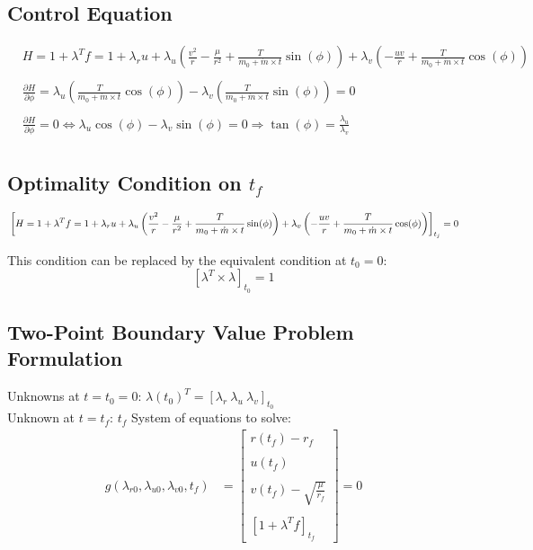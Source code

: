 \documentclass{article}
\begin{document}
	\subsection{Control Equation}
	\begin{align*}
		& H=1+\lambda^T f=1+\lambda_r u+\lambda_u\left(\frac{v^2}{r}-\frac{\mu}{r^2}+\frac{T}{m_0+\dot{m} \times t} \sin (\phi)\right)+\lambda_v\left(-\frac{u v}{r}+\frac{T}{m_0+\dot{m} \times t} \cos (\phi)\right) \\ \\
		& \frac{\partial H}{\partial \phi}=\lambda_u\left(\frac{T}{m_0+\dot{m} \times t} \cos (\phi)\right)-\lambda_v\left(\frac{T}{m_0+\dot{m} \times t} \sin (\phi)\right)=0 \\ \\
		& \frac{\partial H}{\partial \phi}=0 \Leftrightarrow \lambda_u \cos (\phi)-\lambda_v \sin (\phi)=0 \Rightarrow \tan (\phi)=\frac{\lambda_u}{\lambda_v} \\
	\end{align*}
	
	\subsection{Optimality Condition on $t_f$}
	\[
	\\
	\left[H=1+\lambda^T f=1+\lambda_r u+\lambda_u\left(\frac{v^2}{r}-\frac{\mu}{r^2}+\frac{T}{m_0+\dot{m} \times t} \sin (\phi)\right)+\lambda_v\left(-\frac{u v}{r}+\frac{T}{m_0+\dot{m} \times t} \cos (\phi)\right)\right]_{t_j}=0
	\\ \] \newline
	
	This condition can be replaced by the equivalent condition at $t_0=0$:
	\[
	\left[\lambda^T \times \lambda\right]_{t_0}=1
	\]
	
	\subsection{Two-Point Boundary Value Problem Formulation}
	Unknowns at $t=t_0=0$: $\lambda(t_0)^T = [\lambda_r \ \lambda_u \ \lambda_v]_{t_0}$ \\
	Unknown at $t=t_f$: $t_f$
	System of equations to solve:
	\begin{align*}
		g(\lambda_{r0}, \lambda_{u0}, \lambda_{v0}, t_f) &= \left[\begin{array}{c}
			r(t_f) - r_f \\ \\
			u(t_f) \\ \\
			v(t_f) - \sqrt{\frac{\mu}{r_f}} \\ \\
			\left[1 + \lambda^T f\right]_{t_f}
		\end{array}\right] = 0
	\end{align*}
	
\end{document}
